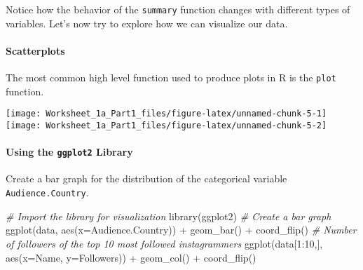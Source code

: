 \documentclass[
]{article}
\newenvironment{Shaded}{\begin{snugshade}}{\end{snugshade}}
\newcommand{\AttributeTok}[1]{\textcolor[rgb]{0.77,0.63,0.00}{#1}}
\newcommand{\CommentTok}[1]{\textcolor[rgb]{0.56,0.35,0.01}{\textit{#1}}}
\newcommand{\DecValTok}[1]{\textcolor[rgb]{0.00,0.00,0.81}{#1}}
\newcommand{\FunctionTok}[1]{\textcolor[rgb]{0.00,0.00,0.00}{#1}}
\newcommand{\NormalTok}[1]{#1}
\newcommand{\SpecialCharTok}[1]{\textcolor[rgb]{0.00,0.00,0.00}{#1}}
\newcommand{\StringTok}[1]{\textcolor[rgb]{0.31,0.60,0.02}{#1}}
\begin{document}
Notice how the behavior of the \texttt{summary} function changes with
different types of variables. Let's now try to explore how we can
visualize our data.

\pagebreak

\hypertarget{scatterplots}{%
\paragraph{Scatterplots}\label{scatterplots}}

The most common high level function used to produce plots in R is the
\texttt{plot} function.

\begin{Shaded}
\end{Shaded}

\texttt{[image: Worksheet\_1a\_Part1\_files/figure-latex/unnamed-chunk-5-1]}
\texttt{[image: Worksheet\_1a\_Part1\_files/figure-latex/unnamed-chunk-5-2]}

\hypertarget{using-the-ggplot2-library}{%
\paragraph{\texorpdfstring{Using the \texttt{ggplot2}
Library}{Using the ggplot2 Library}}\label{using-the-ggplot2-library}}

Create a bar graph for the distribution of the categorical variable
\texttt{Audience.Country}.

\begin{Shaded}
\begin{Highlighting}[]
\CommentTok{\# Import the library for visualization}
\FunctionTok{library}\NormalTok{(ggplot2) }
\CommentTok{\# Create a bar graph}
\FunctionTok{ggplot}\NormalTok{(data, }\FunctionTok{aes}\NormalTok{(}\AttributeTok{x=}\NormalTok{Audience.Country)) }\SpecialCharTok{+} \FunctionTok{geom\_bar}\NormalTok{() }\SpecialCharTok{+} \FunctionTok{coord\_flip}\NormalTok{()}
\CommentTok{\# Number of followers of the top 10 most followed instagrammers}
\FunctionTok{ggplot}\NormalTok{(data[}\DecValTok{1}\SpecialCharTok{:}\DecValTok{10}\NormalTok{,], }\FunctionTok{aes}\NormalTok{(}\AttributeTok{x=}\NormalTok{Name, }\AttributeTok{y=}\NormalTok{Followers)) }\SpecialCharTok{+} \FunctionTok{geom\_col}\NormalTok{() }\SpecialCharTok{+} \FunctionTok{coord\_flip}\NormalTok{()}
\end{Highlighting}
\end{Shaded}
\end{document}
